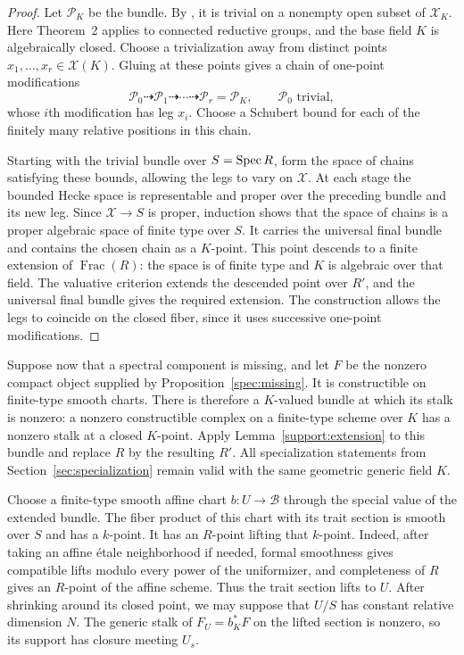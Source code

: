 \begin{proof}
Let $\mathcal P_K$ be the bundle.  By
\cite[Theorem~2 and Remark~2(b)]{DrinfeldSimpson}, it is trivial on a
nonempty open subset of $\mathscr X_K$.  Here Theorem~2 applies to
connected reductive groups, and the base field $K$ is algebraically
closed.  Choose a trivialization away from distinct points
$x_1,\ldots,x_r\in\mathscr X(K)$.  Gluing at these points gives a chain
of one-point modifications
\[
 \mathcal P_0\dashrightarrow\mathcal P_1\dashrightarrow\cdots
 \dashrightarrow\mathcal P_r=\mathcal P_K,
 \qquad \mathcal P_0\text{ trivial},
\]
whose $i$th modification has leg $x_i$.  Choose a Schubert bound for each
of the finitely many relative positions in this chain.

Starting with the trivial bundle over $S=\operatorname{Spec} R$, form the space of
chains satisfying these bounds, allowing the legs to vary on
$\mathscr X$.  At each stage the bounded Hecke space is representable
and proper over the preceding bundle and its new leg.  Since
$\mathscr X\to S$ is proper, induction shows that the space of chains is
a proper algebraic space of finite type over $S$.  It carries the
universal final bundle and contains the chosen chain as a $K$-point.
This point descends to a finite extension of $\operatorname{Frac}(R)$:
the space is of finite type and $K$ is algebraic over that field.  The
valuative criterion extends the descended point over $R'$, and the
universal final bundle gives the required extension.  The construction
allows the legs to coincide on the closed fiber, since it uses successive
one-point modifications.
\end{proof}

Suppose now that a spectral component is missing, and let $F$ be the
nonzero compact object supplied by Proposition~\ref{spec:missing}.
It is constructible on finite-type smooth charts.  There is therefore a
$K$-valued bundle at which its stalk is nonzero: a nonzero constructible
complex on a finite-type scheme over $K$ has a nonzero stalk at a closed
$K$-point.  Apply Lemma~\ref{support:extension} to this bundle and replace
$R$ by the resulting $R'$.  All specialization statements from
Section~\ref{sec:specialization} remain valid with the same geometric
generic field $K$.

Choose a finite-type smooth affine chart $b:U\to\mathcal B$ through
the special value of the extended bundle.  The fiber product of this
chart with its trait section is smooth over $S$ and has a $k$-point.
It has an $R$-point lifting that $k$-point.  Indeed, after taking an
affine \'etale neighborhood if needed, formal smoothness gives
compatible lifts modulo every power of the uniformizer, and completeness
of $R$ gives an $R$-point of the affine scheme.  Thus the trait section
lifts to $U$.  After shrinking around its closed point, we may suppose
that $U/S$ has constant relative dimension $N$.  The generic stalk of
$F_U=b_K^*F$ on the lifted section is nonzero, so its support has closure
meeting $U_s$.

